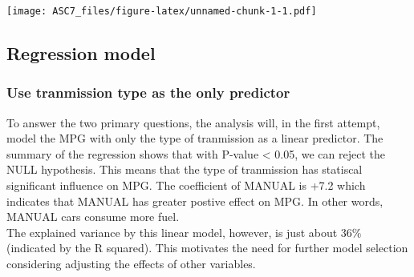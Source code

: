 \documentclass[]{article}
\newenvironment{Shaded}{\begin{snugshade}}{\end{snugshade}}
\newcommand{\KeywordTok}[1]{\textcolor[rgb]{0.13,0.29,0.53}{\textbf{#1}}}
\newcommand{\DataTypeTok}[1]{\textcolor[rgb]{0.13,0.29,0.53}{#1}}
\newcommand{\StringTok}[1]{\textcolor[rgb]{0.31,0.60,0.02}{#1}}
\newcommand{\OperatorTok}[1]{\textcolor[rgb]{0.81,0.36,0.00}{\textbf{#1}}}
\newcommand{\NormalTok}[1]{#1}
\begin{document}
\begin{Shaded}
\end{Shaded}

\texttt{[image: ASC7\_files/figure-latex/unnamed-chunk-1-1.pdf]}

\subsection{Regression model}\label{regression-model}

\subsubsection{Use tranmission type as the only
predictor}\label{use-tranmission-type-as-the-only-predictor}

To answer the two primary questions, the analysis will, in the first
attempt, model the MPG with only the type of tranmission as a linear
predictor. The summary of the regression shows that with P-value
\textless{} 0.05, we can reject the NULL hypothesis. This means that the
type of tranmission has statiscal significant influence on MPG. The
coefficient of MANUAL is +7.2 which indicates that MANUAL has greater
postive effect on MPG. In other words, MANUAL cars consume more fuel.\\
The explained variance by this linear model, however, is just about 36\%
(indicated by the R squared). This motivates the need for further model
selection considering adjusting the effects of other variables.
\end{document}
